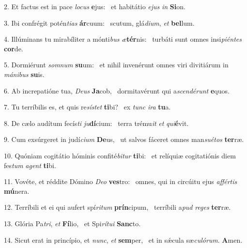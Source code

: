 2. Et factus est in pace \textit{lo}\textit{cus} \textbf{e}jus: \ast\  et habitátio \textit{e}\textit{jus} \textit{in} \textbf{Si}on.\

3. Ibi confrégit potén\textit{ti}\textit{as} \textbf{ár}cuum: \ast\  scutum, glá\textit{di}\textit{um}, \textit{et} \textbf{bel}lum.\

4. Illúminans tu mirabíliter a mónti\textit{bus} \textit{æ}\textbf{tér}nis: \ast\  turbáti sunt omnes insi\textit{pi}\textit{én}\textit{tes} \textbf{cor}de.\

5. Dormiérunt \textit{som}\textit{num} \textbf{su}um: \ast\  et nihil invenérunt omnes viri divitiárum in \textit{má}\textit{ni}\textit{bus} \textbf{su}is.\

6. Ab increpatióne tua, \textit{De}\textit{us} \textbf{Ja}cob, \ast\  dormitavérunt qui a\textit{scen}\textit{dé}\textit{runt} \textbf{e}quos.\

7. Tu terríbilis es, et quis re\textit{sís}\textit{tet} \textbf{ti}bi? \ast\  ex \textit{tunc} \textit{i}\textit{ra} \textbf{tu}a.\

8. De cælo audítum fecís\textit{ti} \textit{ju}\textbf{dí}cium: \ast\  terra trému\textit{it} \textit{et} \textit{qui}\textbf{é}vit.\

9. Cum exsúrgeret in judí\textit{ci}\textit{um} \textbf{De}us, \ast\  ut salvos fáceret omnes man\textit{su}\textit{é}\textit{tos} \textbf{ter}ræ.\

10. Quóniam cogitátio hóminis confité\textit{bi}\textit{tur} \textbf{ti}bi: \ast\  et relíquiæ cogitatiónis diem fes\textit{tum} \textit{a}\textit{gent} \textbf{ti}bi.\

11. Vovéte, et réddite Dómino \textit{De}\textit{o} \textbf{ves}tro: \ast\  omnes, qui in circúitu ejus \textit{af}\textit{fér}\textit{tis} \textbf{mú}nera.\

12. Terríbili et ei qui aufert spí\textit{ri}\textit{tum} \textbf{prín}cipum, \ast\  terríbili a\textit{pud} \textit{re}\textit{ges} \textbf{ter}ræ.\

13. Glória Pa\textit{tri}, \textit{et} \textbf{Fí}lio, \ast\  et Spi\textit{rí}\textit{tu}\textit{i} \textbf{Sanc}to.\

14. Sicut erat in princípio, et \textit{nunc}, \textit{et} \textbf{sem}per, \ast\  et in sǽcula sæ\textit{cu}\textit{ló}\textit{rum}. \textbf{A}men.\


